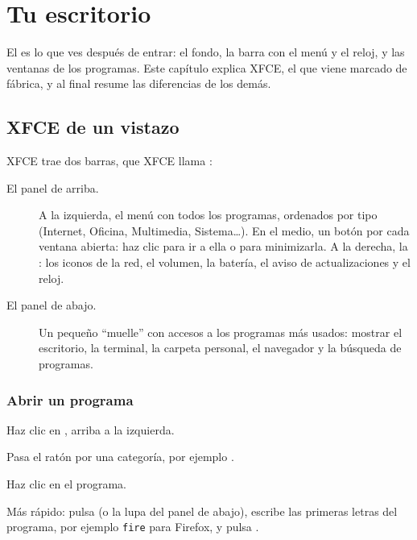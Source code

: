 \chapter{Tu escritorio}\label{cap:06-escritorio}

El  es lo que ves después de entrar: el fondo, la barra
con el menú y el reloj, y las ventanas de los programas. Este capítulo
explica XFCE, el que viene marcado de fábrica, y al final resume las
diferencias de los demás.

\section{XFCE de un vistazo}\label{sec:xfce}


XFCE trae dos barras, que XFCE llama  \cite{xfce-docs}:

\begin{description}
  \item[El panel de arriba.] A la izquierda, el menú 
    con todos los programas, ordenados por tipo (Internet, Oficina,
    Multimedia, Sistema\ldots). En el medio, un botón por cada ventana
    abierta: haz clic para ir a ella o para minimizarla. A la derecha, la
    : los iconos de la red, el volumen, la batería, el
    aviso de actualizaciones y el reloj.
  \item[El panel de abajo.] Un pequeño \enquote{muelle} con accesos a los
    programas más usados: mostrar el escritorio, la terminal, la carpeta
    personal, el navegador y la búsqueda de programas.
\end{description}


\subsection{Abrir un programa}
\begin{pasos}
  \item Haz clic en , arriba a la izquierda.
  \item Pasa el ratón por una categoría, por ejemplo .
  \item Haz clic en el programa.
\end{pasos}

\begin{consejo}
Más rápido: pulsa  (o la lupa del panel de abajo), escribe
las primeras letras del programa, por ejemplo \texttt{fire} para Firefox, y
pulsa .
\end{consejo}

